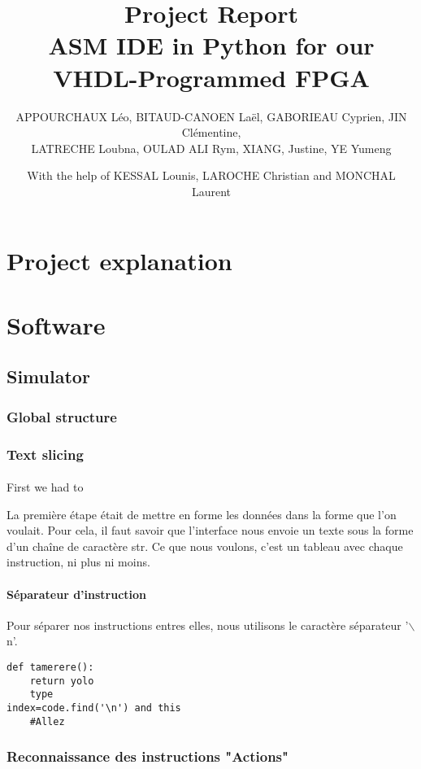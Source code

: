 \documentclass{article}
\title{Project Report\\ASM IDE in Python for our VHDL-Programmed FPGA}
\author{APPOURCHAUX Léo, BITAUD-CANOEN Laël, GABORIEAU Cyprien, JIN Clémentine,\\LATRECHE Loubna, OULAD ALI Rym, XIANG, Justine, YE Yumeng}
\begin{document}
\maketitle
\author{With the help of KESSAL Lounis, LAROCHE Christian and MONCHAL Laurent}

\tableofcontents






\newpage
\section{Project explanation}


\newpage
\section{Software}
\subsection{Simulator}
\subsubsection{Global structure}
\subsubsection{Text slicing}
\paragraph{}First we had to 

La première étape était de mettre en forme les données dans la forme que l'on voulait. Pour cela, il faut savoir que l'interface nous envoie un texte sous la forme d'un chaîne de caractère str.
Ce que nous voulons, c'est un tableau avec chaque instruction, ni plus ni moins.
\paragraph{Séparateur d'instruction}
Pour séparer nos instructions entres elles, nous utilisons le caractère séparateur '\(\backslash\)n'. 
\begin{lstlisting}[language=MyPython]
def tamerere():
    return yolo
    type
index=code.find('\n') and this
    #Allez
\end{lstlisting}


\subsubsection{Reconnaissance des instructions "Actions"}
\end{document}
